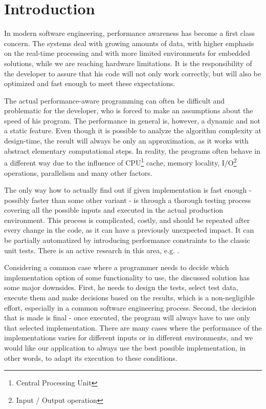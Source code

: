 \chapter*{Introduction}

In modern software engineering, performance awareness has become a first class concern. The systems deal with growing amounts of data, with higher emphasis on the real-time processing and with more limited environments for embedded solutions, while we are reaching hardware limitations. It is the responsibility of the developer to assure that his code will not only work correctly, but will also be optimized and fast enough to meet these expectations.

The actual performance-aware programming can often be difficult and problematic for the developer, who is forced to make an assumptions about the speed of his program. The performance in general is, however, a dynamic and not a static feature. Even though it is possible to analyze the algorithm complexity at design-time, the result will always be only an approximation, as it works with abstract elementary computational steps. In reality, the programs often behave in a different way due to the influence of CPU\footnote{Central Processing Unit} cache, memory locality, I/O\footnote{Input / Output operation} operations, parallelism and many other factors. 

The only way how to actually find out if given implementation is fast enough - possibly faster than some other variant - is through a thorough testing process covering all the possible inputs and executed in the actual production environment. This process is complicated, costly, and should be repeated after every change in the code, as it can have a previously unexpected impact. It can be partially automatized by introducing performance constraints to the classic unit tests. There is an active research in this area, e.g. \cite{bulej_capturing_2012,horky_performance_2013,horky_utilizing_2015}.

Considering a common case where a programmer needs to decide which implementation option of some functionality to use, the discussed solution has some major downsides. First, he needs to design the tests, select test data, execute them and make decisions based on the results, which is a non-negligible effort, especially in a common software engineering process. Second, the decision that is made is final - once executed, the program will always have to use only that selected implementation. There are many cases where the performance of the implementations varies for different inputs or in different environments, and we would like our application to always use the best possible implementation, in other words, to adapt its execution to these conditions.

